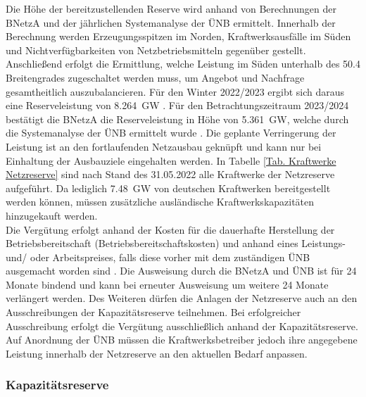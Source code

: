 			Die Höhe der bereitzustellenden Reserve wird anhand von Berechnungen der BNetzA und der jährlichen Systemanalyse der ÜNB ermittelt.
			Innerhalb der Berechnung werden Erzeugungsspitzen im Norden, Kraftwerksausfälle im Süden und Nichtverfügbarkeiten von Netzbetriebsmitteln gegenüber gestellt.
			Anschließend erfolgt die Ermittlung, welche Leistung im Süden unterhalb des \num{50,4} Breitengrades zugeschaltet werden muss, um Angebot und Nachfrage gesamtheitlich auszubalancieren.
			Für den Winter 2022/2023 ergibt sich daraus eine Reserveleistung von \SI{8,264}{\giga\watt} \cite{Bedarf_Netz_Kapa_Reserve}.
			Für den Betrachtungszeitraum 2023/2024 bestätigt die BNetzA die Reserveleistung in Höhe von \SI{5,361}{\giga\watt}, welche durch die Systemanalyse der ÜNB ermittelt wurde \cite{Bedarf_Netz_Kapa_Reserve}.		
			Die geplante Verringerung der Leistung ist an den fortlaufenden Netzausbau geknüpft und kann nur bei Einhaltung der Ausbauziele eingehalten werden. 
			In Tabelle \ref{Tab. Kraftwerke Netzreserve} sind nach Stand des 31.05.2022 alle Kraftwerke der Netzreserve aufgeführt. 
			Da lediglich \SI{7,48}{\giga\watt} von deutschen Kraftwerken bereitgestellt werden können, müssen zusätzliche ausländische Kraftwerkskapazitäten hinzugekauft werden. \\		
			
			Die Vergütung erfolgt anhand der Kosten für die dauerhafte Herstellung der Betriebsbereitschaft (Betriebsbereitschaftskosten) und anhand eines Leistungs- und/ oder Arbeitspreises, falls diese vorher mit dem zuständigen ÜNB ausgemacht worden sind \cite{EnWG}.
			Die Ausweisung durch die BNetzA und ÜNB ist für 24 Monate bindend und kann bei erneuter Ausweisung um weitere 24 Monate verlängert werden.		
			Des Weiteren dürfen die Anlagen der Netzreserve auch an den Ausschreibungen der Kapazitätsreserve teilnehmen.
			Bei erfolgreicher Ausschreibung erfolgt die Vergütung ausschließlich anhand der Kapazitätsreserve.
			Auf Anordnung der ÜNB müssen die Kraftwerksbetreiber jedoch ihre angegebene Leistung innerhalb der Netzreserve an den aktuellen Bedarf anpassen.
		    
		\subsubsection{Kapazitätsreserve}
		
